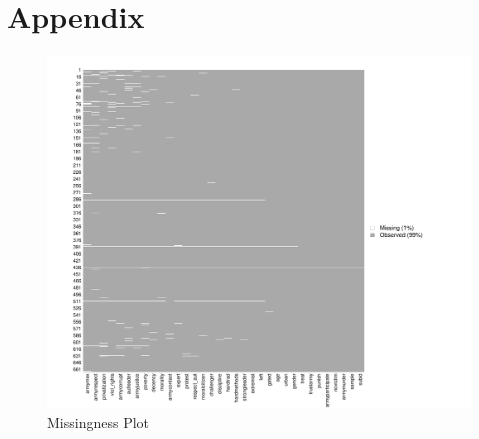 \documentclass[
  12pt,
]{article}
\begin{document}
\hypertarget{appendix}{%
\section{Appendix}\label{appendix}}

\begin{figure}
\centering
\includegraphics{marko-oliver_final-proj_files/figure-latex/unnamed-chunk-10-1.pdf}
\caption{Missingness Plot}
\end{figure}
\end{document}
